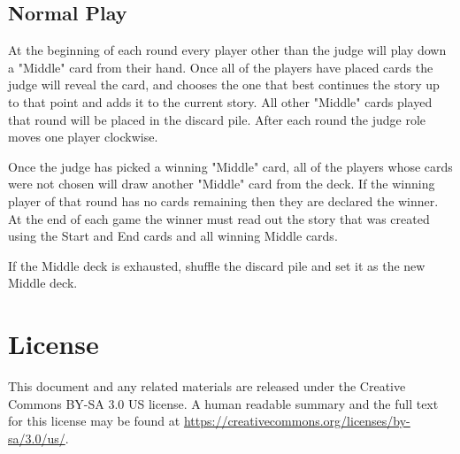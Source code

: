 \documentclass[twocolumn]{article}
\begin{document}
\subsection*{Normal Play}

At the beginning of each round every player other than the judge will play down a "Middle" card from their hand. Once all of the players have placed cards the judge will reveal the card, and chooses the one that best continues the story up to that point and adds it to the current story. All other "Middle" cards played that round will be placed in the discard pile. After each round the judge role moves one player clockwise.

Once the judge has picked a winning "Middle" card, all of the players whose cards were not chosen will draw another "Middle" card from the deck. If the winning player of that round has no cards remaining then they are declared the winner. At the end of each game the winner must read out the story that was created using the Start and End cards and all winning Middle cards.

If the Middle deck is exhausted, shuffle the discard pile and set it as the new Middle deck.

\section*{License}

This document and any related materials are released under the Creative Commons BY-SA 3.0 US license. A human readable summary and the full text for this license may be found at \url{https://creativecommons.org/licenses/by-sa/3.0/us/}.
\end{document}

